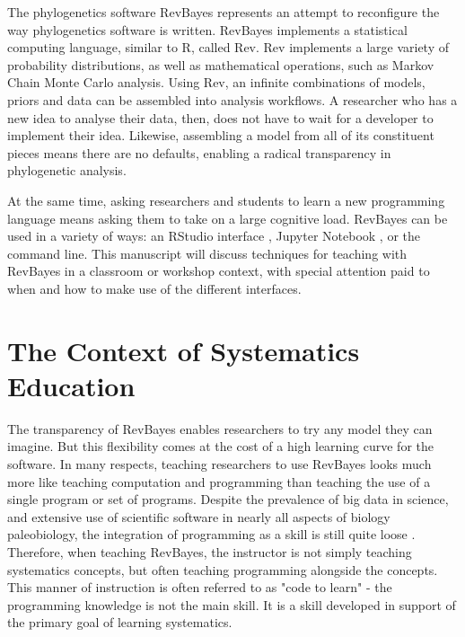\documentclass{article}
\begin{document}
The phylogenetics software RevBayes \citep{Hoehna2014b, Hoehna2016a} represents an attempt to reconfigure the way phylogenetics software is written.
RevBayes implements a statistical computing language, similar to R, called Rev.
Rev implements a large variety of probability distributions, as well as mathematical operations, such as Markov Chain Monte Carlo analysis.
Using Rev, an infinite combinations of models, priors and data can be assembled into analysis workflows.
A researcher who has a new idea to analyse their data, then, does not have to wait for a developer to implement their idea.
Likewise, assembling a model from all of its constituent pieces means there are no defaults, enabling a radical transparency in phylogenetic analysis. 

At the same time, asking researchers and students to learn a new programming language means asking them to take on a large cognitive load.
RevBayes can be used in a variety of ways: an RStudio interface \citep{Rstudio}, Jupyter Notebook \citep{jupyter}, or the command line.
This manuscript will discuss techniques for teaching with RevBayes in a classroom or workshop context, with special attention paid to when and how to make use of the different interfaces.

\section{The Context of Systematics Education}

The transparency of RevBayes enables researchers to try any model they can imagine.
But this flexibility comes at the cost of a high learning curve for the software. 
In many respects, teaching researchers to use RevBayes looks much more like teaching computation and programming than teaching the use of a single program or set of programs.
Despite the prevalence of big data in science, and extensive use of scientific software in nearly all aspects of biology paleobiology, the integration of programming as a skill is still quite loose \citep{sayres2018}.
Therefore, when teaching RevBayes, the instructor is not simply teaching systematics concepts, but often teaching programming alongside the concepts.
This manner of instruction is often referred to as "code to learn" - the programming knowledge is not the main skill.
It is a skill developed in support of the primary goal of learning systematics.
\end{document}
